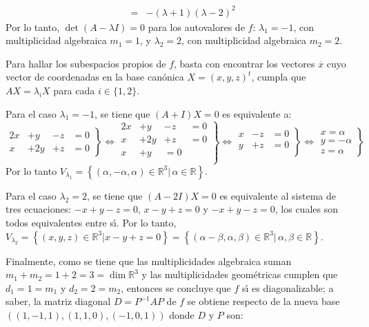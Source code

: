 \begin{solucion}
\begin{eqnarray*}
  & = & -(\lambda + 1)(\lambda - 2)^2
 \end{eqnarray*}
 Por lo tanto, $\det (A - \lambda I) = 0$ para los autovalores de $f$: $\lambda_1 = -1$, con multiplicidad algebraica $m_1 = 1$, y $\lambda_2 = 2$, con multiplicidad algebraica $m_2 = 2$.
 \par 
 Para hallar los subespacios propios de $f$, basta con encontrar los vectores $\overline{x}$ cuyo vector de coordenadas en la base can\'onica $X = (x, y, z)^t$, cumpla que $AX = \lambda_i X$ para cada $i \in \{ 1, 2\}$.
 \par 
 Para el caso $\lambda_1 = -1$, se tiene que $(A + I)X = 0$ es equivalente a:
 \begin{equation*}
  \left. 
  \begin{matrix}
   2x & +  y & - z & = 0 \\
    x & + 2y & + z & = 0
  \end{matrix}
  \right\}
  \Leftrightarrow 
  \left. 
  \begin{matrix}
   2x & +  y & - z & = 0 \\
    x & + 2y & + z & = 0 \\
   x & + y & = 0 \\
  \end{matrix}
  \right\}
  \Leftrightarrow 
  \left. 
  \begin{matrix}
   x & - z & = 0 \\
   y & + z & = 0 \\
  \end{matrix}
  \right\}
  \Leftrightarrow 
  \left. 
  \begin{matrix}
   x = \alpha \\
   y = - \alpha \\
   z = \alpha
  \end{matrix}
  \right\}
 \end{equation*}
 Por lo tanto $V_{\lambda_1} = \left\{ (\alpha, -\alpha, \alpha) \in \mathbb{R}^3 | \, \alpha \in \mathbb{R} \right\}$.
 \par 
 Para el caso $\lambda_2 = 2$, se tiene que $(A - 2I)X = 0$ es equivalente al sistema de tres ecuaciones: $-x + y -z = 0$, $x-y+z = 0$ y $-x+y-z = 0$, los cuales son todos equivalentes entre s\'{\i}. Por lo tanto, $V_{\lambda_2} = \left\{ (x,y,z) \in \mathbb{R}^3 | x-y+z = 0 \right\} = \left\{ (\alpha - \beta, \alpha, \beta ) \in \mathbb{R}^3 | \, \alpha, \beta \in \mathbb{R} \right\}$.
 \par 
 Finalmente, como se tiene que las multiplicidades algebraica suman $m_1 + m_2 = 1 + 2 = 3 = \dim \mathbb{R}^3$ y las multiplicidades geom\'etricas cumplen que $d_1 = 1 = m_1$ y $d_2 = 2 = m_2$, entonces se concluye que $f$ s\'{\i} es diagonalizable; a saber, la matriz diagonal $D = P^{-1}AP$ de $f$ se obtiene respecto de la nueva base $\left( (1, -1, 1), (1, 1, 0), (-1, 0, 1) \right)$ donde $D$ y $P$ son:

\end{solucion}
